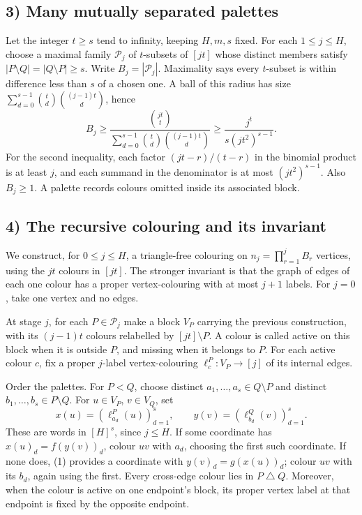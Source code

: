 \subsection{3) Many mutually separated palettes}
Let the integer $t\geq s$ tend to infinity, keeping $H,m,s$ fixed.
For each $1\leq j\leq H$, choose a maximal family $\mathcal P_j$ of
$t$-subsets of $[jt]$ whose distinct members satisfy
$|P\setminus Q|=|Q\setminus P|\geq s$. Write $B_j=|\mathcal P_j|$.
Maximality says every $t$-subset is within difference less than $s$
of a chosen one. A ball of this radius has size
$\sum_{d=0}^{s-1}\binom td\binom{(j-1)t}d$, hence
\[
 B_j\geq
 \frac{\binom{jt}t}{\sum_{d=0}^{s-1}\binom td\binom{(j-1)t}d}
 \geq\frac{j^t}{s(jt^2)^{s-1}}.                         \tag{2}
\]
For the second inequality, each factor $(jt-r)/(t-r)$ in the binomial
product is at least $j$, and each summand in the denominator is at most
$(jt^2)^{s-1}$. Also $B_j\geq1$. A palette records colours omitted
inside its associated block.

\subsection{4) The recursive colouring and its invariant}
We construct, for $0\leq j\leq H$, a triangle-free colouring on
$n_j=\prod_{r=1}^j B_r$ vertices, using the $jt$ colours in $[jt]$.
The stronger invariant is that the graph of edges of each one colour
has a proper vertex-colouring with at most $j+1$ labels.
For $j=0$, take one vertex and no edges.

At stage $j$, for each $P\in\mathcal P_j$ make a block $V_P$ carrying
the previous construction, with its $(j-1)t$ colours relabelled by
$[jt]\setminus P$. A colour is called active on this block when it
is outside $P$, and missing when it belongs to $P$. For each active
colour $c$, fix a proper $j$-label vertex-colouring
$\ell^P_c:V_P\to[j]$ of its internal edges.

Order the palettes. For $P<Q$, choose distinct
$a_1,\ldots,a_s\in Q\setminus P$ and distinct
$b_1,\ldots,b_s\in P\setminus Q$. For $u\in V_P$, $v\in V_Q$, set
\[
 x(u)=(\ell^P_{a_d}(u))_{d=1}^s,\qquad
 y(v)=(\ell^Q_{b_d}(v))_{d=1}^s.
\]
These are words in $[H]^s$, since $j\leq H$. If some coordinate has
$x(u)_d=f(y(v))_d$, colour $uv$ with $a_d$, choosing the first such
coordinate. If none does, (1) provides a coordinate with
$y(v)_d=g(x(u))_d$; colour $uv$ with its $b_d$, again using the first.
Every cross-edge colour lies in $P\mathbin\triangle Q$. Moreover,
when the colour is active on one endpoint's block, its proper vertex
label at that endpoint is fixed by the opposite endpoint.

